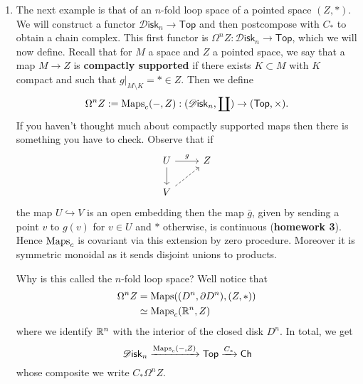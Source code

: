 \documentclass{amsart}
\newcommand{\Disk}{\mathscr{D}\mathsf{isk}_n}
\begin{document}
\begin{enumerate}
    \item The next example is that of an $n$-fold loop space of a pointed space $(Z,*)$.
        We will construct a functor $\Disk\to\mathsf{Top}$ and then postcompose with $C_*$ to obtain a chain complex.
        This first functor is $\Omega^nZ:\Disk\to\mathsf{Top}$, which we will now define.
        Recall that for $M$ a space and $Z$ a pointed space, we say that a map $M\to Z$ is \textbf{compactly
        supported} if there exists $K\subset M$ with $K$ compact and such that $g|_{M\setminus K}=*\in Z$.
        Then we define
        \begin{equation*}
            \Omega^nZ := \Maps_c( -, Z): (\Disk,\coprod)\to(\mathsf{Top},\times).
        \end{equation*}
        If you haven't thought much about compactly supported maps then there is something you have to check.
        Observe that if 
        \begin{equation*}
            \begin{tikzcd}
                U \rar{g}\dar & Z \\
                V  \ar[ru,dashed] & \;
            \end{tikzcd}
        \end{equation*}
        the map $U\hookrightarrow V$ is an open embedding then the map $\bar g$, given by sending
        a point $v$ to $g(v)$ for $v\in U$ and $*$ otherwise, is continuous (\textbf{homework 3}).
        Hence $\operatorname{Maps}_c$ is covariant via this extension by zero procedure. Moreover it is
        symmetric monoidal as it sends disjoint unions to products.

        Why is this called the $n$-fold loop space? Well notice that
        \begin{align*}
            \Omega^nZ &= \operatorname{Maps}( (D^n,\partial D^n), (Z,*)) \\
            &\simeq \operatorname{Maps}_c(\mathbb{R}^n,Z)
        \end{align*}
        where we identify $\mathbb{R}^n$ with the interior of the closed disk $D^n$.
        In total, we get
        \begin{equation*}
            \Disk \xrightarrow{\Maps_c(-,Z)} \mathsf{Top} \xrightarrow{C_*} \mathsf{Ch}
        \end{equation*}
        whose composite we write $C_*\Omega^nZ$.


\end{enumerate}
\end{document}
